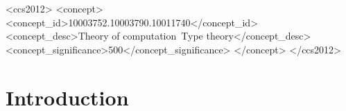\begin{abstract}
{In this paper, we study the impact of the features that define {\mJS}.
We give the first formal description of the language, study the complexity of validation, and prove that, with the addition of dynamic references, this problem moves from P-complete to PSPACE-complete.
We also show that the problem is in P in the special case when there is a fixed bound on the number of distinct dynamic references in each schema. %
We study the schema and data complexities, showing that the problem is PSPACE-complete with respect to the schema size, but is in P when the schema is fixed and only the instance size is allowed to vary.
Finally, we run experiments that show that there are families of schemas where the difference in asymptotic complexity between dynamic
and static references is extremely visible, even with small schemas. 
}

\end{abstract}

\setcounter{tocdepth}{1} %

\begin{CCSXML}
<ccs2012>
<concept>
<concept_id>10003752.10003790.10011740</concept_id>
<concept_desc>Theory of computation~Type theory</concept_desc>
<concept_significance>500</concept_significance>
</concept>
</ccs2012>
\end{CCSXML}






\maketitle

\section{Introduction}\label{sec:intro}


